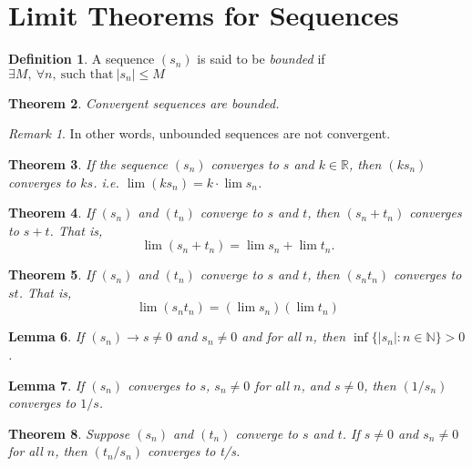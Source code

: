 \documentclass[12pt, lettersize]{book}
\theoremstyle{plain}
\newtheorem{thm}{Theorem}[section]
\newtheorem{lem}[thm]{Lemma}
\theoremstyle{definition}
\newtheorem{dfn}[thm]{Definition}
\theoremstyle{remark}
\newtheorem*{rem}{Remark}
\newcommand{\N}{\mathbb{N}}
\begin{document}
	\section{Limit Theorems for Sequences}
	\begin{dfn}\label{def:bound}
		A sequence $(s_n)$ is said to be \emph{bounded} if $\exists M,\ \forall n,\ \text{such that}\ |s_n|\leq M$
	\end{dfn}
	
	\begin{thm}\label{def:convergence is bounded}
		Convergent sequences are bounded.
	\end{thm}
	\begin{rem}
		In other words, unbounded sequences are not convergent.
	\end{rem}
	
	\begin{thm}
		If the sequence $(s_n)$ converges to $s$ and $k\in\mathbb{R}$, then $(ks_n)$ converges to $ks$. i.e. $\lim(ks_n)=k\cdot\lim s_n$.
	\end{thm}
	
	\begin{thm}\label{def:addition}
		If $(s_n)$ and $(t_n)$ converge to $s$ and $t$, then $(s_n+t_n)$ converges to $s+t$. That is,
		\begin{displaymath}
			\lim(s_n+t_n)=\lim s_n+\lim t_n.
		\end{displaymath} 
	\end{thm}
	
	\begin{thm}\label{def:multiplication}
		If $(s_n)$ and $(t_n)$ converge to $s$ and $t$, then $(s_nt_n)$ converges to $st$. That is,
		\begin{displaymath}
			\lim(s_nt_n)=(\lim s_n)(\lim t_n)
		\end{displaymath} 
	\end{thm}
	
	\begin{lem}
		If $(s_n)\rightarrow s\neq0$ and $s_n\neq0$ and  for all $n$, then $\inf\{|s_n|: n\in\N\}>0$.
	\end{lem}
	
	\begin{lem}\label{def:reciprocal}
		If $(s_n)$ converges to $s$, $s_n\neq 0$ for all $n$, and $s\neq 0$, then $(1/s_n)$ converges to $1/s$.
	\end{lem}
	
	
	\begin{thm}
		Suppose $(s_n)$ and $(t_n)$ converge to $s$ and $t$. If $s\neq 0$ and $s_n\neq 0$ for all $n$, then $(t_n/s_n)$ converges to t/s.
	\end{thm}
	
\end{document}
